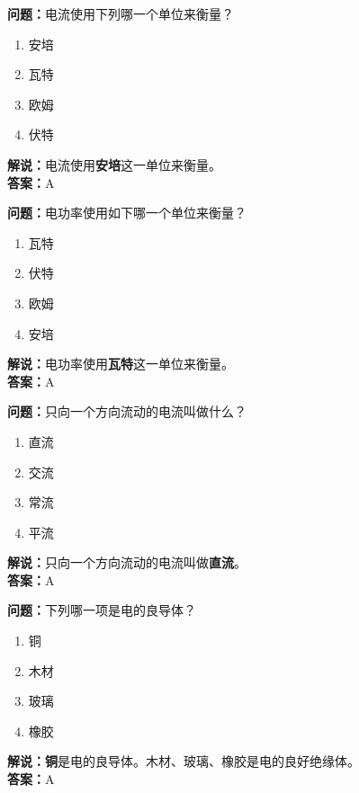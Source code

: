 \textbf{问题：}电流使用下列哪一个单位来衡量？

\begin{enumerate}[label=\Alph*), leftmargin=1.5cm]
	\item 安培
	\item 瓦特
	\item 欧姆
	\item 伏特
\end{enumerate}

\textbf{解说：}电流使用\textbf{安培}这一单位来衡量。\\\textbf{答案：}A%



\textbf{问题：}电功率使用如下哪一个单位来衡量？

\begin{enumerate}[label=\Alph*), leftmargin=1.5cm]
	\item 瓦特
	\item 伏特
	\item 欧姆
	\item 安培
\end{enumerate}

\textbf{解说：}电功率使用\textbf{瓦特}这一单位来衡量。\\\textbf{答案：}A



\textbf{问题：}只向一个方向流动的电流叫做什么？

\begin{enumerate}[label=\Alph*), leftmargin=1.5cm]
	\item 直流
	\item 交流
	\item 常流
	\item 平流
\end{enumerate}

\textbf{解说：}只向一个方向流动的电流叫做\textbf{直流}。\\\textbf{答案：}A



\textbf{问题：}下列哪一项是电的良导体？

\begin{enumerate}[label=\Alph*), leftmargin=1.5cm]
	\item 铜
	\item 木材
	\item 玻璃
	\item 橡胶
\end{enumerate}

\textbf{解说：}\textbf{铜}是电的良导体。木材、玻璃、橡胶是电的良好绝缘体。\\\textbf{答案：}A



